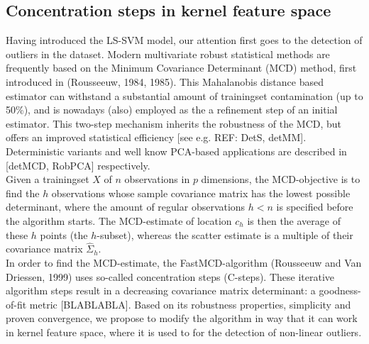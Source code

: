\documentclass[preprint,12pt]{elsarticle}
\begin{document}
\subsection{Concentration steps in kernel feature space}

Having introduced the LS-SVM model, our attention first goes to the detection of outliers in the dataset. Modern multivariate robust statistical methods are frequently based on the Minimum Covariance Determinant (MCD) method, first introduced in  (Rousseeuw, 1984, 1985). This Mahalanobis distance based estimator can withstand a substantial amount of trainingset contamination (up to 50\%), and is nowadays (also) employed as the a refinement step of an initial estimator. This two-step mechanism inherits the robustness of the MCD, but offers an improved statistical efficiency [see e.g. REF: DetS, detMM]. Deterministic variants and well know PCA-based applications are described in [detMCD, RobPCA] respectively. \\

Given a trainingset $X$ of $n$ observations in $p$ dimensions, the MCD-objective is to find the $h$ observations whose sample covariance matrix has the lowest possible determinant, where the amount of regular observations $h < n$ is specified before the algorithm starts. The MCD-estimate of location $c_h$ is then the average of these $h$ points (the $h$-subset), whereas the scatter estimate is a multiple of their covariance matrix $\hat{\Sigma}_{h}$. \\

In order to find the MCD-estimate, the FastMCD-algorithm (Rousseeuw and Van Driessen, 1999) uses so-called concentration steps (C-steps). These iterative algorithm steps result in a decreasing covariance matrix determinant: a goodness-of-fit metric [BLABLABLA]. Based on its robustness properties, simplicity and proven convergence, we propose to modify the algorithm in way that it can work in kernel feature space, where it is used to for the detection of non-linear outliers.\\
\end{document}
